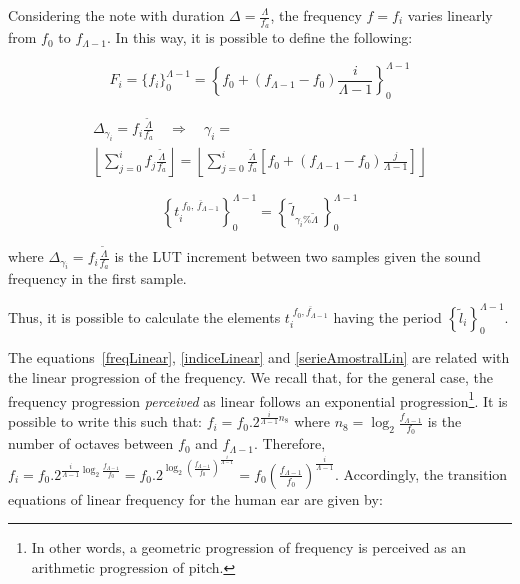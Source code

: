 \documentclass[
 aip,
 jmp,
 amsmath,amssymb,
 reprint,
]{revtex4-1}
\begin{document}
Considering the note with duration $\Delta = \frac{\Lambda}{f_a}$, the frequency $f=f_i$ varies linearly from $f_0$ to $f_{\Lambda -1}$. In this way, it is possible to define the following:

\begin{equation}\label{freqLinear}
 F_i=\{f_i\}_0^{\Lambda-1}=\left\{f_0 + (f_{\Lambda-1}-f_0)\frac{i}{\Lambda-1} \right\}_0^{\Lambda-1}
\end{equation}

\begin{multline}\label{indiceLinear}
 \Delta_{\gamma_i}=f_i\frac{\widetilde{\Lambda}}{f_a} \quad \Rightarrow \quad \gamma_i= \\ \left \lfloor \sum_{j=0}^{i} f_j\frac{\widetilde{\Lambda}}{f_a} \right \rfloor   =\left \lfloor \sum_{j=0}^{i} \frac{\widetilde{\Lambda}}{f_a} \left [f_0 + (f_{\Lambda-1}-f_0)\frac{j}{\Lambda-1} \right ] \right \rfloor 
\end{multline}

\begin{equation}\label{serieAmostralLin}
 \left\{t_i^{\;\overline{f_0,\, f_{\Lambda-1}}}\right\}_0^{\Lambda-1}=\left\{\,\widetilde{l}_{\gamma_i \% \widetilde{\Lambda}}\,\right\}_0^{\Lambda-1}
\end{equation}

where $\Delta_{\gamma_i}=f_i\frac{\widetilde{\Lambda}}{f_a}$ is the LUT increment between two samples given the sound frequency in the first sample.

Thus, it is possible to calculate the elements $t_i^{\;\overline{f_0,f_{\Lambda-1}}}$ having the period $\left\{\widetilde{l}_i\right\}_0^{\Lambda-1}$.

The equations~\ref{freqLinear}, \ref{indiceLinear} and \ref{serieAmostralLin} are related with the linear progression of the frequency. We recall that, for the general case, the frequency progression \emph{perceived} as linear follows an exponential progression\footnote{In other words, a geometric progression of frequency is perceived as an arithmetic progression of pitch.}.
It is possible to write this such that: $f_i=f_0 . 2^{\frac{i}{\Lambda-1} n_8}$ where  $n_8=\log_2\frac{f_{\Lambda-1}}{f_0}$ is the number of octaves between $f_0$ and $f_{\Lambda-1}$.
Therefore, $f_i=f_0 . 2^{\frac{i}{\Lambda-1}\log_2\frac{f_{\Lambda-1}}{f_0}}=
 f_0 . 2^{\log_2\left ( \frac{f_{\Lambda-1}}{f_0} \right )^{\frac{i}{\Lambda-1}}}=
 f_0 \left ( \frac{f_{\Lambda-1}}{f_0} \right ) ^{\frac{i}{\Lambda -1}}$. Accordingly, the transition equations of linear frequency for the human ear are given by:
\end{document}
